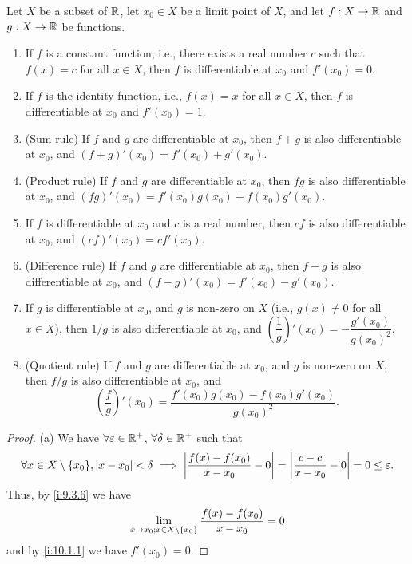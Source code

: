\begin{thm}\label{i:10.1.13}
  Let \(X\) be a subset of \(\mathbb{R}\), let \(x_0 \in X\) be a limit point of \(X\), and let \(f : X \to \mathbb{R}\) and \(g : X \to \mathbb{R}\) be functions.
  \begin{enumerate}
    \item If \(f\) is a constant function, i.e., there exists a real number \(c\) such that \(f(x) = c\) for all \(x \in X\), then \(f\) is differentiable at \(x_0\) and \(f'(x_0) = 0\).
    \item If \(f\) is the identity function, i.e., \(f(x) = x\) for all \(x \in X\), then \(f\) is differentiable at \(x_0\) and \(f'(x_0) = 1\).
    \item (Sum rule)
          If \(f\) and \(g\) are differentiable at \(x_0\), then \(f + g\) is also differentiable at \(x_0\), and \((f + g)'(x_0) = f'(x_0) + g'(x_0)\).
    \item (Product rule)
          If \(f\) and \(g\) are differentiable at \(x_0\), then \(fg\) is also differentiable at \(x_0\), and \((fg)'(x_0) = f'(x_0)g(x_0) + f(x_0)g'(x_0)\).
    \item If \(f\) is differentiable at \(x_0\) and \(c\) is a real number, then \(cf\) is also differentiable at \(x_0\), and \((cf)'(x_0) = cf'(x_0)\).
    \item (Difference rule)
          If \(f\) and \(g\) are differentiable at \(x_0\), then \(f - g\) is also differentiable at \(x_0\), and \((f - g)'(x_0) = f'(x_0) - g'(x_0)\).
    \item If \(g\) is differentiable at \(x_0\), and \(g\) is non-zero on \(X\) (i.e., \(g(x) \neq 0\) for all \(x \in X\)), then \(1 / g\) is also differentiable at \(x_0\), and \((\dfrac{1}{g})'(x_0) = -\dfrac{g'(x_0)}{g(x_0)^2}\).
    \item (Quotient rule)
          If \(f\) and \(g\) are differentiable at \(x_0\), and \(g\) is non-zero on \(X\), then \(f / g\) is also differentiable at \(x_0\), and
          \[
            (\dfrac{f}{g})'(x_0) = \dfrac{f'(x_0) g(x_0) - f(x_0) g'(x_0)}{g(x_0)^2}.
          \]
  \end{enumerate}
\end{thm}

\begin{proof}{(a)}
  We have \(\forall \varepsilon \in \mathbb{R}^+\), \(\forall \delta \in \mathbb{R}^+\) such that
  \[
    \forall x \in X \setminus \set{x_0}, \abs{x - x_0} < \delta \implies \abs{\dfrac{f(x) - f(x_0)}{x - x_0} - 0} = \abs{\dfrac{c - c}{x - x_0} - 0} = 0 \leq \varepsilon.
  \]
  Thus, by \cref{i:9.3.6} we have
  \[
    \lim_{x \to x_0 ; x \in X \setminus \left\lbrace x_0\right\rbrace} \dfrac{f(x) - f(x_0)}{x - x_0} = 0
  \]
  and by \cref{i:10.1.1} we have \(f'(x_0) = 0\).
\end{proof}

